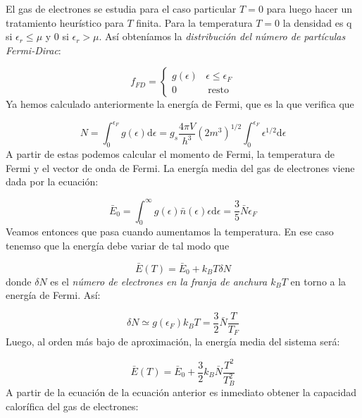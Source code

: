 \documentclass[12pt,a4paper]{article}
\numberwithin{equation}{section}
\numberwithin{figure}{section}
\newcommand{\D}{\mathrm{d}}
\theoremstyle{definition}
\begin{document}
El gas de electrones se estudia para el caso particular $T=0$ para luego hacer un tratamiento heurístico para $T$ finita. Para la temperatura $T=0$ la densidad es q si $\epsilon_r \leq \mu$ y 0 si $\epsilon_r > \mu$. Así obteníamos la \textit{distribución del número de partículas Fermi-Dirac}:

\begin{equation}
f_{FD} = \left\lbrace \begin{array}{lr}
g(\epsilon) & \epsilon \leq \epsilon_F \\
0  \quad & \ \mathrm{resto}
\end{array} \right.
\end{equation}
Ya hemos calculado anteriormente la energía de Fermi, que es la que verifica que

\begin{equation}
N = \int_0^{\epsilon_F} g(\epsilon) \D \epsilon = g_s \frac{4 \pi V}{h^3} (2m^3)^{1/2} \int_0^{\epsilon_F} \epsilon^{1/2} \D \epsilon
\end{equation}
A partir de estas podemos calcular el momento de Fermi, la temperatura de Fermi y el vector de onda de Fermi. La energía media del gas de electrones viene dada por la ecuación:

\begin{equation}
\bar{E}_0 = \int_0^\infty g(\epsilon) \bar{n}(\epsilon) \epsilon \D \epsilon  = \frac{3}{5} \bar{N} \epsilon_F
\end{equation}
Veamos entonces que pasa cuando aumentamos la temperatura. En ese caso tenemso que la energía debe variar de tal modo que

\begin{equation}
\bar{E} (T) = \bar{E}_0 + k_B T \delta N
\end{equation}
donde $\delta N$ es el \textit{número de electrones en la franja de anchura $k_BT$} en torno a la energía de Fermi. Así:

\begin{equation}
\delta N \simeq g(\epsilon_F) k_B T = \frac{3}{2} \bar{N} \frac{T}{T_F}
\end{equation}
Luego, al orden más bajo de aproximación, la energía media del sistema será:

\begin{equation}
\bar{E} (T) = \bar{E}_0 + \frac{3}{2} k_B \bar{N} \frac{T^2}{T_B^2}
\end{equation}
A partir de la ecuación de la ecuación anterior es inmediato obtener la capacidad calorífica del gas de electrones:
\end{document}
